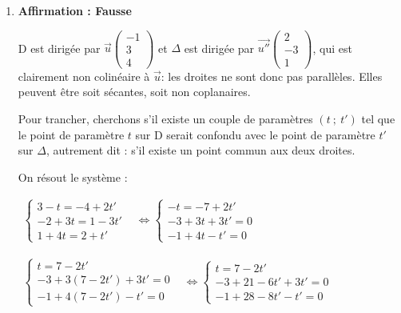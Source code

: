 \documentclass[10pt]{article}
\providecommand{\vect}[1]{\overrightarrow{#1}}
\begin{document}
\begin{enumerate}
Comme ce produit scalaire n'est pas nul, pas besoin de calculer le second : on peut affirmer que D n'est pas orthogonale à (ABC), car elle n'est pas orthogonale à (AB) qui est une droite du plan (ABC).

Ici, on peut cependant adopter une \textbf{méthode différente} : on repère que les trois points A, B et C partagent la même ordonnée : 3, et sont réputés non alignés, donc le plan ABC est le plan d'équation $y = 3$, et un vecteur normal à (ABC) est le vecteur $\vect{j}$. Comme $\vect{j}$ est clairement non colinéaire à $\vect{u}$, alors on peut en déduire que D n'est pas orthogonale à (ABC).
\item \textbf{Affirmation : Fausse}

D est dirigée par $\vect{u}\begin{pmatrix}-1\\3\\4\end{pmatrix}$ et $\Delta$ est dirigée par $\vect{u''} \begin{pmatrix}2\\-3\\1\end{pmatrix}$, qui est clairement non colinéaire à $\vect{u}$: les droites ne sont donc pas parallèles. Elles peuvent être soit sécantes, soit non coplanaires.

Pour trancher, cherchons s'il existe un couple de paramètres $(t~;~t')$ tel que le point de paramètre $t$ sur D serait confondu avec le point de paramètre $t'$ sur $\Delta$, autrement dit : s'il existe un point commun aux deux droites.

On résout le système :

$\begin{aligned}
\begin{cases}
3-t = -4+2t'\\
-2+3t = 1 - 3t'\\
1+4t = 2+t'
\end{cases} &\iff
\begin{cases}
-t = -7+2t'\\
-3+3t+3t' = 0\\
-1+4t-t' = 0
\end{cases}
\end{aligned}$

$\begin{aligned}
\begin{cases}
t = 7-2t'\\
-3+3(7-2t')+3t' = 0\\
-1+4(7-2t')-t' = 0
\end{cases}
 &\iff
\begin{cases}
t = 7-2t'\\
-3 + 21 - 6t'+3t'=0\\
-1+28-8t'-t' = 0
\end{cases}\\
\end{aligned}$


\end{enumerate}
\end{document}
